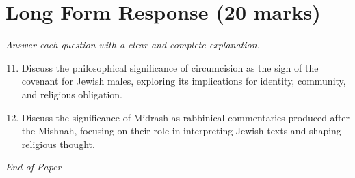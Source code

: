 \documentclass[12pt]{article}
\begin{document}
\section*{Long Form Response (20 marks)}
\textit{Answer each question with a clear and complete explanation.}
\begin{enumerate}[label=\arabic*.]
\setcounter{enumi}{10}
\item Discuss the philosophical significance of circumcision as the sign of the covenant for
Jewish males, exploring its implications for identity, community, and religious
obligation.
\item Discuss the significance of Midrash as rabbinical commentaries produced after the Mishnah,
focusing on their role in interpreting Jewish texts and shaping religious thought.
\end{enumerate}

\vfill
\noindent\textit{End of Paper}
\end{document}
